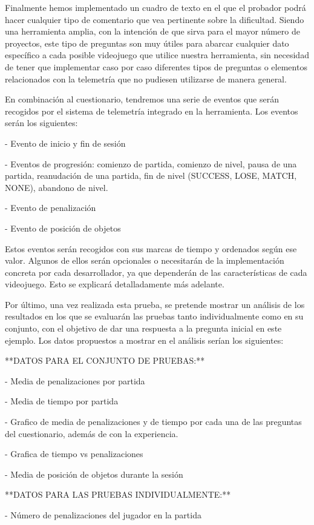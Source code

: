 Finalmente hemos implementado un cuadro de texto en el que el probador podrá hacer cualquier tipo de comentario que vea pertinente sobre la dificultad. Siendo una herramienta amplia, con la intención de que sirva para el mayor número de proyectos, este tipo de preguntas son muy útiles para abarcar cualquier dato específico a cada posible videojuego que utilice nuestra herramienta, sin necesidad de tener que implementar caso por caso diferentes tipos de preguntas o elementos relacionados con la telemetría que no pudiesen utilizarse de manera general.

En combinación al cuestionario, tendremos una serie de eventos que serán recogidos por el sistema de telemetría integrado en la herramienta. Los eventos serán los siguientes:

- Evento de inicio y fin de sesión

- Eventos de progresión: comienzo de partida, comienzo de nivel, pausa de una partida, reanudación de una partida, fin de nivel (SUCCESS, LOSE, MATCH, NONE), abandono de nivel.

- Evento de penalización

- Evento de posición de objetos

Estos eventos serán recogidos con sus marcas de tiempo y ordenados según ese valor. Algunos de ellos serán opcionales o necesitarán de la implementación concreta por cada desarrollador, ya que dependerán de las características de cada videojuego. Esto se explicará detalladamente más adelante.

Por último, una vez realizada esta prueba, se pretende mostrar un análisis de los resultados en los que se evaluarán las pruebas tanto individualmente como en su conjunto, con el objetivo de dar una respuesta a la pregunta inicial en este ejemplo. Los datos propuestos a mostrar en el análisis serían los siguientes:

**DATOS PARA EL CONJUNTO DE PRUEBAS:**

- Media de penalizaciones por partida

- Media de tiempo por partida

- Grafico de media de penalizaciones y de tiempo por cada una de las preguntas del cuestionario, además de con la experiencia.

- Grafica de tiempo vs penalizaciones

- Media de posición de objetos durante la sesión

**DATOS PARA LAS PRUEBAS INDIVIDUALMENTE:**

- Número de penalizaciones del jugador en la partida

